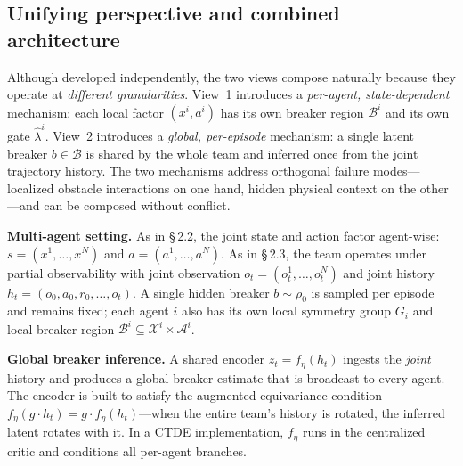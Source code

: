 \documentclass[11pt]{article}
\begin{document}
\subsection*{Unifying perspective and combined architecture}

Although developed independently, the two views compose naturally because they
operate at \textit{different granularities}. View~1 introduces a \textit{per-agent,
state-dependent} mechanism: each local factor $(x^i, a^i)$ has its own breaker
region $\mathcal{B}^i$ and its own gate $\widehat{\lambda}^i$. View~2
introduces a \textit{global, per-episode} mechanism: a single latent breaker
$b \in \mathcal{B}$ is shared by the whole team and inferred once from the
joint trajectory history. The two mechanisms address orthogonal failure
modes---localized obstacle interactions on one hand, hidden physical context on
the other---and can be composed without conflict.

\textbf{Multi-agent setting.} As in \S\,2.2, the joint state and action factor
agent-wise: $s = (x^1, \dots, x^N)$ and $a = (a^1, \dots, a^N)$. As in \S\,2.3,
the team operates under partial observability with joint observation
$o_t = (o^1_t, \dots, o^N_t)$ and joint history
$h_t = (o_0, a_0, r_0, \dots, o_t)$. A single hidden breaker $b \sim \rho_0$
is sampled per episode and remains fixed; each agent $i$ also has its own
local symmetry group $G_i$ and local breaker region
$\mathcal{B}^i \subseteq \mathcal{X}^i \times \mathcal{A}^i$.

\textbf{Global breaker inference.} A shared encoder $z_t = f_\eta(h_t)$ ingests the
\textit{joint} history and produces a global breaker estimate that is broadcast to
every agent. The encoder is built to satisfy the augmented-equivariance
condition $f_\eta(g \cdot h_t) = g \cdot f_\eta(h_t)$---when the entire
team's history is rotated, the inferred latent rotates with it. In a CTDE
implementation, $f_\eta$ runs in the centralized critic and conditions all
per-agent branches.
\end{document}
